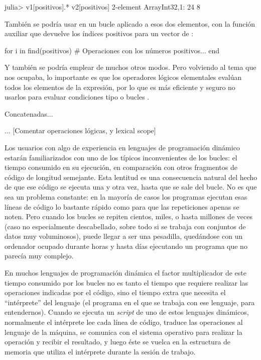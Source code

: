 ﻿\documentclass[spanish]{article}
\begin{document}
julia> v1[positivos].* v2[positivos]
2-element Array{Int32,1}:
  24
   8

También se podría usar en un bucle  aplicado a esos dos elementos, con la
función auxiliar  que devuelve los índices positivos para un
vector de :

for i in find(positivos)
  # Operaciones con los números positivos...
end

Y también se podría emplear de muchos otros modos. Pero volviendo al tema que
nos ocupaba, lo importante es que los operadores lógicos elementales evalúan
todos los elementos de la expresión, por lo que es más eficiente y seguro
no usarlos para evaluar condiciones tipo  o bucles .

Concatenadas...





...
[Comentar operaciones lógicas, y lexical scope]

Los usuarios con algo de experiencia en lenguajes de programación
dinámico estarán familiarizados con uno de los típicos inconvenientes
de los bucles: el tiempo consumido en su ejecución, en comparación con otros
fragmentos de código de longitud semejante. Esta lentitud es una
consecuencia natural del hecho de que ese código se ejecuta una y otra vez,
hasta que se sale del bucle. No es que sea un problema constante:
en la mayoría de casos los programas ejecutan esas líneas de código lo
bastante rápido como para que las repeticiones apenas se noten. Pero
cuando los bucles se repiten cientos, miles, o hasta millones de veces
(caso no especialmente descabellado, sobre todo si se trabaja con
conjuntos de datos muy voluminosos), puede llegar a ser una pesadilla,
quedándose con un ordenador ocupado durante horas y hasta días
ejecutando un programa que no parecía muy complejo.

En muchos lenguajes de programación dinámica
el factor multiplicador de este tiempo consumido por los bucles no
es tanto el tiempo que requiere realizar las operaciones indicadas por
el código, sino el tiempo extra que necesita el ``intérprete'' del lenguaje
(el programa en el que se trabaja con ese lenguaje, para entendernos).
Cuando se ejecuta un \emph{script} de uno de estos lenguajes dinámicos,
normalmente el intérprete lee cada línea de código, traduce las operaciones al
lenguaje de la máquina, se comunica con el sistema operativo para
realizar la operación y recibir el resultado, y luego éste se vuelca en la
estructura de memoria que utiliza el intérprete durante la sesión de trabajo.
\end{document}

